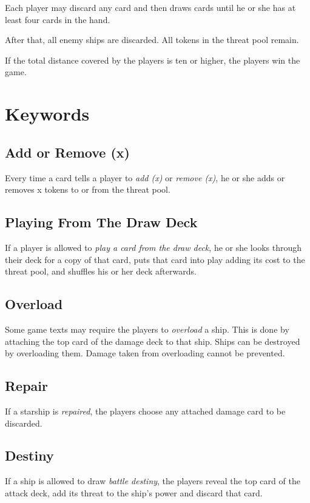 \documentclass[11pt, a4paper]{article}
\begin{document}
Each player may discard any card and then draws cards until he or she has at
least four cards in the hand.

After that, all enemy ships are discarded. All tokens in the threat pool remain.

If the total distance covered by the players is ten or higher, the players win
the game.

\section{Keywords}
\subsection{Add or Remove (x)}
Every time a card tells a player to \emph{add (x)} or \emph{remove (x)}, he or
she adds or removes x tokens to or from the threat pool.

\subsection{Playing From The Draw Deck}
If a player is allowed to \emph{play a card from the draw deck}, he or she looks
through their deck for a copy of that card, puts that card into play adding its
cost to the threat pool, and shuffles his or her deck afterwards.

\subsection{Overload}

Some game texts may require the players to \emph{overload} a ship. This is done
by attaching the top card of the damage deck to that ship. Ships can be
destroyed by overloading them. Damage taken from overloading cannot be
prevented.

\subsection{Repair}

If a starship is \emph{repaired}, the players choose any attached damage
card to be discarded.

\subsection{Destiny}

If a ship is allowed to draw \emph{battle destiny}, the players reveal the top
card of the attack deck, add its threat to the ship's power and discard that
card.
\end{document}
